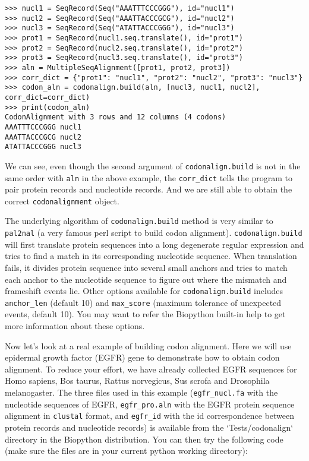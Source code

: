 \documentclass{article}
\begin{document}
\begin{verbatim}
>>> nucl1 = SeqRecord(Seq("AAATTTCCCGGG"), id="nucl1")
>>> nucl2 = SeqRecord(Seq("AAATTACCCGCG"), id="nucl2")
>>> nucl3 = SeqRecord(Seq("ATATTACCCGGG"), id="nucl3")
>>> prot1 = SeqRecord(nucl1.seq.translate(), id="prot1")
>>> prot2 = SeqRecord(nucl2.seq.translate(), id="prot2")
>>> prot3 = SeqRecord(nucl3.seq.translate(), id="prot3")
>>> aln = MultipleSeqAlignment([prot1, prot2, prot3])
>>> corr_dict = {"prot1": "nucl1", "prot2": "nucl2", "prot3": "nucl3"}
>>> codon_aln = codonalign.build(aln, [nucl3, nucl1, nucl2], corr_dict=corr_dict)
>>> print(codon_aln)
CodonAlignment with 3 rows and 12 columns (4 codons)
AAATTTCCCGGG nucl1
AAATTACCCGCG nucl2
ATATTACCCGGG nucl3
\end{verbatim}

We can see, even though the second argument of \texttt{codonalign.build}
is not in the same order with \texttt{aln} in the above example, the
\texttt{corr\_dict} tells the program to pair protein records and
nucleotide records. And we are still able to obtain the correct
\texttt{codonalignment} object.

The underlying algorithm of \texttt{codonalign.build} method is very
similar to \texttt{pal2nal} (a very famous perl script to build codon
alignment). \texttt{codonalign.build} will first translate protein
sequences into a long degenerate regular expression and tries to find a
match in its corresponding nucleotide sequence. When translation fails,
it divides protein sequence into several small anchors and tries to match
each anchor to the nucleotide sequence to figure out where the mismatch
and frameshift events lie. Other options available for
\texttt{codonalign.build} includes \texttt{anchor\_len} (default 10) and
\texttt{max\_score} (maximum tolerance of unexpected events, default
10). You may want to refer the Biopython built-in help to get more
information about these options.

Now let's look at a real example of building codon alignment. Here we
will use epidermal growth factor (EGFR) gene to demonstrate how to
obtain codon alignment. To reduce your effort, we have already collected
EGFR sequences for Homo sapiens, Bos taurus, Rattus norvegicus,
Sus scrofa and Drosophila melanogaster. The three files used in this example
(\texttt{egfr\_nucl.fa} with the nucleotide sequences of EGFR,
\texttt{egfr\_pro.aln} with the EGFR protein sequence alignment in
\texttt{clustal} format, and \texttt{egfr\_id} with the id correspondence between protein records and nucleotide records) is available from the `Tests/codonalign` directory in the Biopython distribution.
You can then try the following code (make sure the files are in
your current python working directory):
\end{document}
